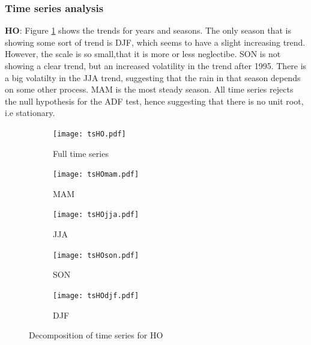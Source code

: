 \documentclass{article}
\begin{document}
	\subsubsection{Time series analysis}
	{\Large\textbf{HO}}: Figure \ref{tsHO} shows the trends for years and seasons. The only season that is showing some sort of trend is DJF, which seems to have a slight increasing trend. However, the scale is so small,that it is more or less neglectibe. SON is not showing a clear trend, but an increased volatility in the trend after 1995. There is a big volatilty in the JJA trend, suggesting that the rain in that season depends on some other process. MAM is the most steady season. All time series rejects the null hypothesis for the ADF test, hence suggesting that there is no unit root, i.e stationary. 
	\begin{figure}[H]
		\centering
		\begin{subfigure}{0.6\textwidth}
			\centering
			\texttt{[image: tsHO.pdf]}
			\caption{Full time series}
		\end{subfigure}
		\begin{subfigure}{0.5\textwidth}
			\centering
			\texttt{[image: tsHOmam.pdf]}
			\caption{MAM}
		\end{subfigure}%
		\begin{subfigure}{0.5\textwidth}
			\centering
			\texttt{[image: tsHOjja.pdf]}
			\caption{JJA}
		\end{subfigure}
		\begin{subfigure}{0.5\textwidth}
			\centering
			\texttt{[image: tsHOson.pdf]}
			\caption{SON}
		\end{subfigure}%
		\begin{subfigure}{0.5\textwidth}
			\centering
			\texttt{[image: tsHOdjf.pdf]}
			\caption{DJF}
		\end{subfigure}%
		\caption{Decomposition of time series for HO}
		\label{tsHO}
	\end{figure}
\end{document}
